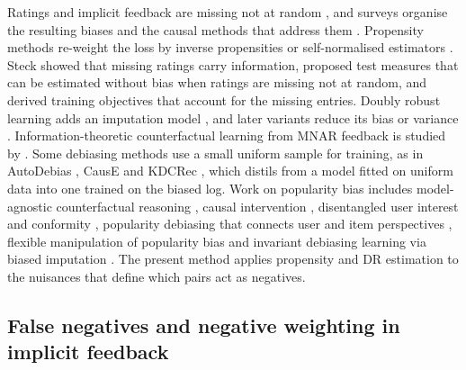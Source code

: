 Ratings and implicit feedback are missing not at random
\citep{marlin2009collaborative}, and surveys organise the resulting biases and the
causal methods that address them \citep{chen2023bias,gao2024causalsurvey}. Propensity
methods re-weight the loss by inverse propensities or self-normalised estimators
\citep{schnabel2016,swaminathan2015snips,saito2020unbiased}. Steck \citep{steck2010mnar}
showed that missing ratings carry information, proposed test measures that can be
estimated without bias when ratings are missing not at random, and derived
training objectives that account for the missing entries. Doubly robust learning adds an imputation model
\citep{wang2019drjl}, and later variants reduce its bias or variance
\citep{guo2021mrdr,dai2022gdr,li2023stabledr}. Information-theoretic counterfactual
learning from MNAR feedback is studied by \citet{wang2020cvib}. Some debiasing methods use a small uniform
sample for training, as in AutoDebias \citep{chen2021autodebias}, CausE
\citep{bonner2018cause} and KDCRec \citep{liu2020kdcrec}, which distils from a model fitted on uniform data into one trained on the biased log.
Work on popularity bias includes model-agnostic counterfactual reasoning \citep{wei2021macr},
causal intervention \citep{zhang2021pda}, disentangled user interest and conformity
\citep{zheng2021dice}, popularity debiasing that connects user and item perspectives
\citep{boratto2021connecting}, flexible manipulation of popularity bias
\citep{okamura2024flexibly} and invariant debiasing learning via biased imputation
\citep{bai2025invariant}. The present method applies propensity and DR estimation to the
nuisances that define which pairs act as negatives.

\subsection{False negatives and negative weighting in implicit feedback}

